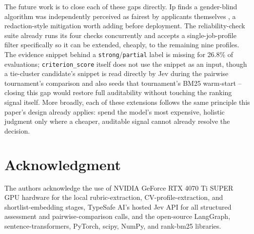 \documentclass[journal]{IEEEtran}
\begin{document}
The future work is to close each of these gaps directly. Ip finds a gender-blind algorithm was independently perceived as fairest by applicants themselves \cite{ref26}, a redaction-style mitigation worth adding before deployment. The reliability-check suite already runs its four checks concurrently and accepts a single-job-profile filter specifically so it can be extended, cheaply, to the remaining nine profiles. The evidence snippet behind a \texttt{strong}/\texttt{partial} label is missing for 26.8\% of evaluations; \texttt{criterion\_score} itself does not use the snippet as an input, though a tie-cluster candidate's snippet is read directly by Jev during the pairwise tournament's comparison and also seeds that tournament's BM25 warm-start -- closing this gap would restore full auditability without touching the ranking signal itself. More broadly, each of these extensions follows the same principle this paper's design already applies: spend the model's most expensive, holistic judgment only where a cheaper, auditable signal cannot already resolve the decision.

\section*{Acknowledgment}
The authors acknowledge the use of NVIDIA GeForce RTX 4070 Ti SUPER GPU hardware for the local rubric-extraction, CV-profile-extraction, and shortlist-embedding stages, TypeSafe AI's hosted Jev API for all structured assessment and pairwise-comparison calls, and the open-source LangGraph, sentence-transformers, PyTorch, scipy, NumPy, and rank-bm25 libraries.
\end{document}
